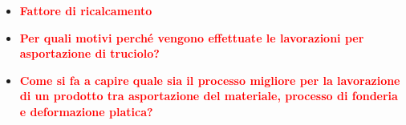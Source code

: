 \documentclass[a4paper, 15pt]{article}
\begin{document}
\begin{itemize}
\item
\textcolor{red}{\textbf{Fattore di ricalcamento}}\\





\item
\textcolor{red}{\textbf{Per quali motivi perché vengono effettuate le lavorazioni per asportazione di truciolo?}}\\





\item
\textcolor{red}{\textbf{Come si fa a capire quale sia il processo migliore per la lavorazione di un prodotto tra asportazione del materiale, processo di fonderia e deformazione platica?}}\\





\end{itemize}
\end{document}
